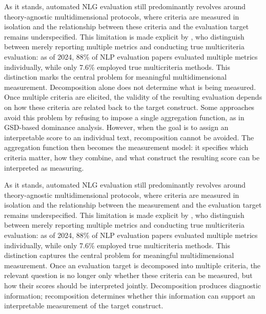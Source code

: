 As it stands, automated NLG evaluation still predominantly revolves around theory-agnostic multidimensional protocols, where criteria are measured in isolation and the relationship between these criteria and the evaluation target remains underspecified. This limitation is made explicit by \citet{arias2025statistical}, who distinguish between merely reporting multiple metrics and conducting true multicriteria evaluation: as of 2024, 88\% of NLP evaluation papers evaluated multiple metrics individually, while only 7.6\% employed true multicriteria methods. This distinction marks the central problem for meaningful multidimensional measurement. Decomposition alone does not determine what is being measured. Once multiple criteria are elicited, the validity of the resulting evaluation depends on how these criteria are related back to the target construct. Some approaches avoid this problem by refusing to impose a single aggregation function, as in GSD-based dominance analysis. However, when the goal is to assign an interpretable score to an individual text, recomposition cannot be avoided. The aggregation function then becomes the measurement model: it specifies which criteria matter, how they combine, and what construct the resulting score can be interpreted as measuring.

As it stands, automated NLG evaluation still predominantly revolves around theory-agnostic multidimensional protocols, where criteria are measured in isolation and the relationship between the measurement and the evaluation target remains underspecified. This limitation is made explicit by \citet{arias2025statistical}, who distinguish between merely reporting multiple metrics and conducting true multicriteria evaluation: as of 2024, 88\% of NLP evaluation papers evaluated multiple metrics individually, while only 7.6\% employed true multicriteria methods. This distinction captures the central problem for meaningful multidimensional measurement. Once an evaluation target is decomposed into multiple criteria, the relevant question is no longer only whether these criteria can be measured, but how their scores should be interpreted jointly. Decomposition produces diagnostic information; recomposition determines whether this information can support an interpretable measurement of the target construct.






